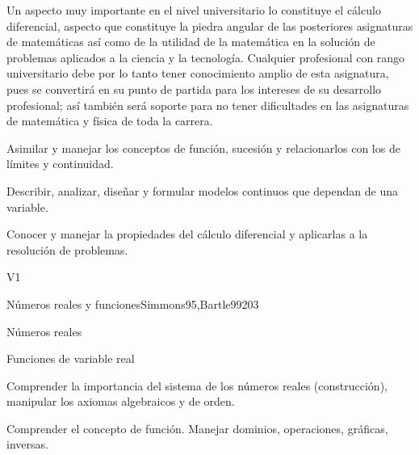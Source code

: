 \begin{syllabus}


\begin{justification}
Un aspecto muy importante en el nivel universitario lo constituye el cálculo diferencial,  aspecto que constituye la piedra angular de las posteriores asignaturas de matemáticas así como de la utilidad de la matemática en la solución de problemas aplicados a la ciencia y la tecnología. Cualquier profesional con rango universitario debe por lo tanto tener conocimiento amplio de esta asignatura, pues se convertirá en su punto de partida para los intereses de su desarrollo profesional; así también será soporte para no tener dificultades en las asignaturas de matemática y física de toda la carrera.
\end{justification}

\begin{goals}
\item Asimilar y manejar los conceptos de función, sucesión y relacionarlos con los de límites y continuidad.
\item Describir, analizar, diseñar y formular modelos continuos que dependan de una variable.
\item Conocer y manejar la propiedades del cálculo diferencial y aplicarlas a la resolución de problemas.
\end{goals}

\begin{outcomes}{V1}
\end{outcomes}

\begin{unit}{Números reales y funciones}{}{Simmons95,Bartle99}{20}{3}
   \begin{topics}
      \item Números reales
      \item Funciones de variable real
   \end{topics}

   \begin{learningoutcomes}
      \item Comprender la importancia del sistema de los números reales (construcción), manipular los axiomas algebraicos y de orden.
      \item Comprender el concepto de función. Manejar dominios, operaciones, gráficas, inversas.
      \end{learningoutcomes}
\end{unit}


\end{syllabus}
